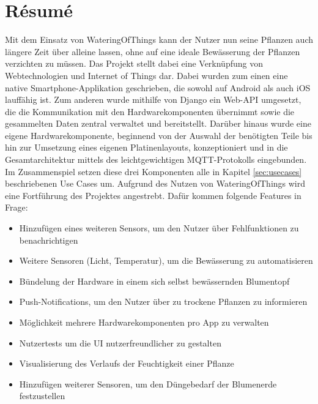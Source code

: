 \section{Résumé}
Mit dem Einsatz von WateringOfThings kann der Nutzer nun seine Pflanzen auch längere Zeit über alleine lassen, ohne auf eine ideale Bewässerung der Pflanzen verzichten zu müssen. Das Projekt stellt dabei eine Verknüpfung von Webtechnologien und Internet of Things dar. Dabei wurden zum einen eine native Smartphone-Applikation geschrieben, die sowohl auf Android als auch iOS lauffähig ist. Zum anderen wurde mithilfe von Django ein Web-API umgesetzt, die die Kommunikation mit den Hardwarekomponenten übernimmt sowie die gesammelten Daten zentral verwaltet und bereitstellt. Darüber hinaus wurde eine eigene Hardwarekomponente, beginnend von der Auswahl der benötigten Teile bis hin zur Umsetzung eines eigenen Platinenlayouts, konzeptioniert und in die Gesamtarchitektur mittels des leichtgewichtigen MQTT-Protokolls eingebunden. Im Zusammenspiel setzen diese drei Komponenten alle in Kapitel \ref{sec:usecases} beschriebenen Use Cases um. Aufgrund des Nutzen von WateringOfThings wird eine Fortführung des Projektes angestrebt. Dafür kommen folgende Features in Frage:
\begin{itemize}
    \item Hinzufügen eines weiteren Sensors, um den Nutzer über Fehlfunktionen zu benachrichtigen
    \item Weitere Sensoren (Licht, Temperatur), um die Bewässerung zu automatisieren
    \item Bündelung der Hardware in einem sich selbst bewässernden Blumentopf
    \item Push-Notifications, um den Nutzer über zu trockene Pflanzen zu informieren
    \item Möglichkeit mehrere Hardwarekomponenten pro App zu verwalten
    \item Nutzertests um die UI nutzerfreundlicher zu gestalten
    \item Visualisierung des Verlaufs der Feuchtigkeit einer Pflanze
    \item Hinzufügen weiterer Sensoren, um den Düngebedarf der Blumenerde festzustellen
\end{itemize}

